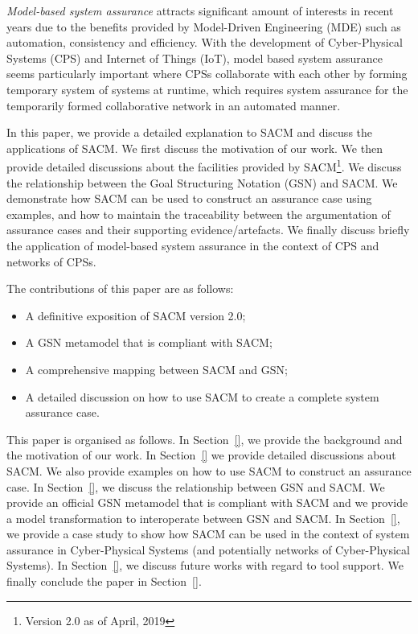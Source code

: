 \textit{Model-based system assurance} attracts significant amount of interests in recent years due to the benefits provided by Model-Driven Engineering (MDE) such as automation, consistency and efficiency. With the development of Cyber-Physical Systems (CPS) and Internet of Things (IoT), model based system assurance seems particularly important where CPSs collaborate with each other by forming temporary system of systems at runtime, which requires system assurance for the temporarily formed collaborative network in an automated manner.


In this paper, we provide a detailed explanation to SACM and discuss the applications of SACM. We first discuss the motivation of our work.  We then provide detailed discussions about the facilities provided by SACM\footnote{Version 2.0 as of April, 2019}. We discuss the relationship between the Goal Structuring Notation (GSN) and SACM. We demonstrate how SACM can be used to construct an assurance case using examples, and how to maintain the traceability between the argumentation of assurance cases and their supporting evidence/artefacts. We finally discuss briefly the application of model-based system assurance in the context of CPS and networks of CPSs.

The contributions of this paper are as follows:
\begin{itemize}
	\item A definitive exposition of SACM version 2.0;
	\item A GSN metamodel that is compliant with SACM;
	\item A comprehensive mapping between SACM and GSN;
	\item A detailed discussion on how to use SACM to create a complete system assurance case.
\end{itemize}

This paper is organised as follows. In Section~\ref{}, we provide the background and the motivation of our work. In Section~\ref{} we provide detailed discussions about SACM. We also provide examples on how to use SACM to construct an assurance case. In Section~\ref{}, we discuss the relationship between GSN and SACM. We provide an official GSN metamodel that is compliant with SACM and we provide a model transformation to interoperate between GSN and SACM. In Section~\ref{}, we provide a case study to show how SACM can be used in the context of system assurance in Cyber-Physical Systems (and potentially networks of Cyber-Physical Systems). In Section~\ref{}, we discuss future works with regard to tool support. We finally conclude the paper in Section~\ref{}.

